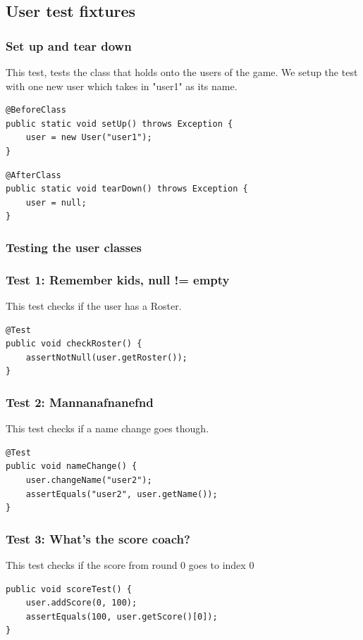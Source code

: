 \documentclass{article}
\begin{document}
\subsection{User test fixtures}
\subsubsection{Set up and tear down}
This test, tests the class that holds onto the users of the game. We setup the test with one new user which takes in "user1" as its name.

\begin{lstlisting}
@BeforeClass
public static void setUp() throws Exception {
	user = new User("user1");
}
\end{lstlisting}

\begin{lstlisting}
@AfterClass
public static void tearDown() throws Exception {
	user = null;
}
\end{lstlisting}

\subsubsection{Testing the user classes}
\subsubsection*{Test 1: Remember kids, null != empty}
This test checks if the user has a Roster.
\begin{lstlisting}
@Test
public void checkRoster() {
	assertNotNull(user.getRoster());
}

\end{lstlisting}
\subsubsection*{Test 2: Mannanafnanefnd}
This test checks if a name change goes though.
\begin{lstlisting}
@Test 
public void nameChange() {
	user.changeName("user2");
	assertEquals("user2", user.getName());
}
\end{lstlisting}
\subsubsection*{Test 3: What's the score coach?}
This test checks if the score from round 0 goes to index 0
\begin{lstlisting}
public void scoreTest() {
	user.addScore(0, 100);
	assertEquals(100, user.getScore()[0]);
}
\end{lstlisting}
\end{document}
